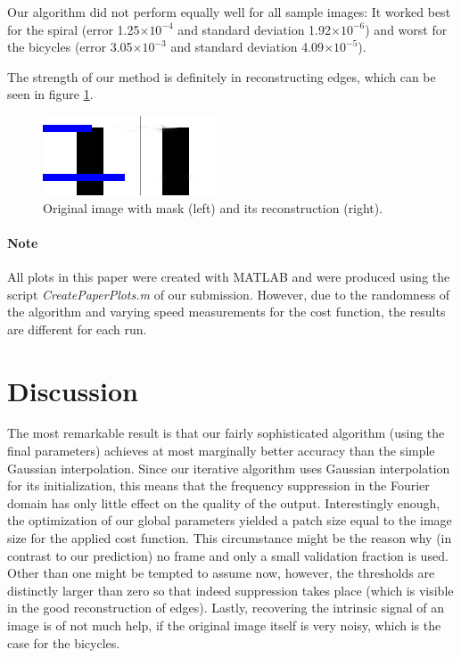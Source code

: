 \documentclass[10pt,conference,compsocconf]{IEEEtran}
\providecommand{\e}[1]{\ensuremath{\times 10^{#1}}}
\begin{document}
Our algorithm did not perform equally well for all sample images: It worked best for the spiral (error 1.25\e{-4} and standard deviation 1.92\e{-6}) and worst for the bicycles (error 3.05\e{-3} and standard deviation 4.09\e{-5}).

The strength of our method is definitely in reconstructing edges, which can be seen in figure \ref{edge_reconstruction}.

\begin{figure}
\centering
\includegraphics[width=0.8\columnwidth]{images/paper_reconstruction_bars32_mask8.png}
\caption{Original image with mask (left) and its reconstruction (right).}
\label{edge_reconstruction}
\end{figure}

\paragraph{Note} All plots in this paper were created with MATLAB and were produced using the script \emph{CreatePaperPlots.m} of our submission. However, due to the randomness of the algorithm and varying speed measurements for the cost function, the results are different for each run.

\section{Discussion}
The most remarkable result is that our fairly sophisticated algorithm (using the final parameters) achieves at most marginally better accuracy than the simple Gaussian interpolation. Since our iterative algorithm uses Gaussian interpolation for its initialization, this means that the frequency suppression in the Fourier domain has only little effect on the quality of the output. Interestingly enough, the optimization of our global parameters yielded a patch size equal to the image size for the applied cost function. This circumstance might be the reason why (in contrast to our prediction) no frame and only a small validation fraction is used. Other than one might be tempted to assume now, however, the thresholds are distinctly larger than zero so that indeed suppression takes place (which is visible in the good reconstruction of edges). Lastly, recovering the intrinsic signal of an image is of not much help, if the original image itself is very noisy, which is the case for the bicycles.
\end{document}
